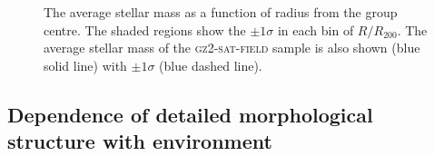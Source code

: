 \begin{figure}
\caption[Average mass with group radius in the \textsc{gz2-group} sample]{The average stellar mass as a function of radius from the group centre. The shaded regions show the $\pm1\sigma$ in each bin of $R/R_{200}$. The average stellar mass of the \textsc{gz2-sat-field} sample is also shown (blue solid line) with $\pm1\sigma$ (blue dashed line).}
\label{fig:massdep}
\end{figure}



\subsection{Dependence of detailed morphological structure with environment}\label{sec:resmorph}

